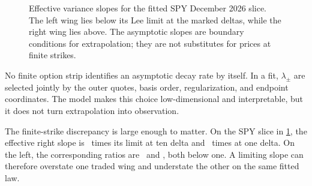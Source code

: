 \begin{figure}[htbp]
\centering
{}
\caption{Effective variance slopes for the fitted SPY December 2026 slice.
The left wing lies below its Lee limit at the marked deltas, while the right
wing lies above.  The asymptotic slopes are boundary conditions for
extrapolation; they are not substitutes for prices at finite strikes.}
\label{fig:lee}
\end{figure}

No finite option strip identifies an asymptotic decay rate by itself.  In a
fit, $\lambda_\pm$ are selected jointly by the outer quotes, basis order,
regularization, and endpoint coordinates.  The model makes this choice
low-dimensional and interpretable, but it does not turn extrapolation into
observation.

The finite-strike discrepancy is large enough to matter.  On the SPY slice
in \cref{fig:lee}, the effective right slope is
\MacLeeRatioTenDeltaCall\ times its limit at ten delta and
\MacLeeRatioOneDeltaCall\ times at one delta.  On the left, the corresponding
ratios are \MacLeeRatioTenDeltaPut\ and \MacLeeRatioOneDeltaPut, both below
one.  A limiting slope can therefore overstate one traded wing and understate
the other on the same fitted law.
